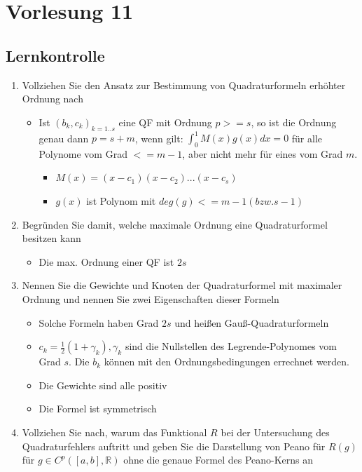 \documentclass[]{article}
\newcommand*{\real}{\ensuremath{\mathbb{R}}}
\begin{document}
\section{Vorlesung 11}
\subsection{Lernkontrolle}
	\begin{enumerate}
		\item Vollziehen Sie den Ansatz zur Bestimmung von Quadraturformeln erhöhter Ordnung nach
			\begin{itemize}
				\item Ist $(b_k, c_k)_{k=1..s}$ eine QF mit Ordnung $p>=s$, so ist die Ordnung genau dann $p = s + m$, wenn gilt: $\int_0^1 M(x) g(x) dx = 0$ für alle Polynome vom Grad $<= m-1$, aber nicht mehr für eines vom Grad $m$.
				\begin{itemize}
					\item $M(x) = (x-c_1)(x-c_2)...(x-c_s)$
					\item $g(x)$ ist Polynom mit $deg(g) <= m-1 (bzw. s-1)$
				\end{itemize}
			\end{itemize}
		\item Begründen Sie damit, welche maximale Ordnung eine Quadraturformel besitzen kann
			\begin{itemize}
				\item Die max. Ordnung einer QF ist $2s$
			\end{itemize}
		\item Nennen Sie die Gewichte und Knoten der Quadraturformel mit maximaler Ordnung und nennen Sie zwei Eigenschaften dieser Formeln
			\begin{itemize}
				\item Solche Formeln haben Grad $2s$ und heißen Gauß-Quadraturformeln
				\item $c_k = \frac{1}{2}(1 + \gamma_k), \gamma_k$ sind die Nullstellen des Legrende-Polynomes vom Grad $s$. Die $b_k$ können mit den Ordnungsbedingungen errechnet werden.
				\item Die Gewichte sind alle positiv
				\item Die Formel ist symmetrisch
			\end{itemize}
		\item Vollziehen Sie nach, warum das Funktional $R$ bei der Untersuchung des Quadraturfehlers auftritt und geben Sie die Darstellung von Peano für $R(g)$ für $g \in C^p([a,b], \real)$ ohne die genaue Formel des Peano-Kerns an

\end{enumerate}
\end{document}
